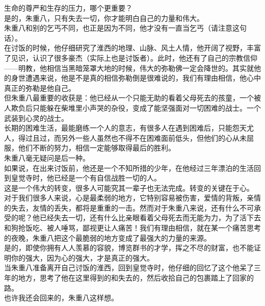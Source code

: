 \begin{multicols}{\theparacolNo}
生命的尊严和生存的压力，哪个更重要？\\

是的，朱重八，只有失去一切，你才能明白自己的力量和伟大。\\

朱重八和别的乞丐不同，也正是因为不同，他才没有一直当乞丐（请注意这句话）。\\

在讨饭的时候，他仔细研究了淮西的地理、山脉、风土人情，他开阔了视野，丰富了见识，认识了很多豪杰（实际上也是讨饭者）。此时，他还有了自己的宗教信仰——明教，他相信当黑暗笼罩大地的时候，伟大的弥勒佛一定会降世的。其实就他的身世遭遇来说，他是不是真的相信弥勒倒是很难说的，我们有理由相信，他心中真正的弥勒是他自己。\\

但朱重八最重要的收获是：他已经从一个只能无助的看着父母死去的孩童，一个被人欺负后只能躲在柴堆里小声哭的杂役，变成了能坚强面对一切困难的战士。一个武装到心灵的战士。\\

长期的困难生活，最能磨练一个人的意志，有很多人在遇到困难后，只能怨天尤人，得过且过，而另外一些人虽然也不得不在困难面前低头，但他们的心从未屈服，他们不断的努力，相信一定能够取得最后的胜利。\\

朱重八毫无疑问是后一种。\\

如果说，在出来讨饭前，他还是一个不知所措的少年，在他经过三年漂泊的生活回到皇觉寺时，他已经是一个有自信战胜一切的人。\\

这是一个伟大的转变，很多人可能究其一辈子也无法完成。转变的关键在于心。\\

对于我们很多人来说，心是最柔弱的地方，它特别容易被伤害，爱情的背叛，亲情的失去，友情的丢失，都将是重重的一击。然而对于朱重八来说，还有什么不可承受的呢？他已经失去一切，还有什么比亲眼看着父母死去而无能为力，为了活下去和狗抢饭吃、被人唾骂，鄙视更让人痛苦！我们有理由相信，就在某一个痛苦思考的夜晚，朱重八把这个最脆弱的地方变成了最强大的力量的来源。\\

是的，即使你拥有人人羡慕的容貌，博览群书的才学，挥之不尽的财富，也不能证明你的强大，因为心的强大，才是真正的强大。\\

当朱重八准备离开自己讨饭的淮西，回到皇觉寺时，他仔细的回忆了这个他呆了三年的地方，思考了他在这里得到的和失去的，然后收拾自己的包裹踏上了回家的路。\\

也许我还会回来的，朱重八这样想。\\
\ifnum{}
	\end{multicols}
\fi
\newpage
